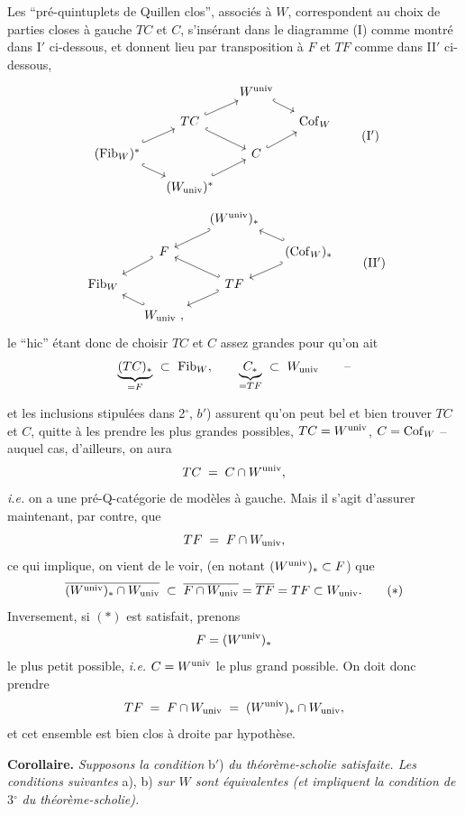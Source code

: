 Les “pré-quintuplets de Quillen clos”, associés à $W$, correspondent au choix de parties closes à gauche $TC$ et $C$, s'insérant dans le diagramme (I) comme montré dans I$'$ ci-dessous, et donnent lieu par transposition à $F$ et $TF$ comme dans II$'$ ci-dessous,
\[
\begin{tikzcd}[column sep=small, row sep=small]
 & & W^{\univ} \arrow[dr, hook] & \\
 & TC \arrow[ur, hook] \arrow[dr, hook] & & \Cof_W \\
(\Fib_W)^* \arrow[ur, hook] \arrow[dr, hook] & & C \arrow[ur, hook] & \\
 & (W_{\univ})^* \arrow[ur, hook] & &
\end{tikzcd}
\tag*{(I$'$)}
\]
\[
\begin{tikzcd}[column sep=small, row sep=small]
 & & (W^{\univ})_* \arrow[dl, hook'] & \\
 & F \arrow[dl, hook'] & & (\Cof_W)_* \arrow[ul, hook'] \arrow[dl, hook'] \\
\Fib_W & & TF \arrow[ul, hook'] \arrow[dl, hook'] & \\
 & W_{\univ}\ , \arrow[ul, hook'] & &
\end{tikzcd}
\tag*{(II$'$)}
\]
le “hic” étant donc de choisir $TC$ et $C$ assez grandes pour qu'on ait
\[ \underbrace{(TC)_*}_{= F} \ \subset\ \mathrm{Fib}_W, \qquad \underbrace{C_*}_{= TF} \ \subset\ W_{\mathrm{univ}} \qquad \text{--} \]


\noindent et les inclusions stipulées dans 2$^\circ$, $b'$) assurent qu'on peut bel et bien trouver $TC$ et $C$, quitte à les prendre les plus grandes possibles, $TC = W^{\mathrm{univ}}$, $C = \mathrm{Cof}_W$ -- auquel cas, d'ailleurs, on aura
\[
TC \;=\; C \cap W^{\mathrm{univ}},
\]
\textit{i.e.} on a une pré-Q-catégorie de modèles à gauche. Mais il s'agit d'assurer maintenant, par contre, que
\[
TF \;=\; F \cap W_{\mathrm{univ}},
\]
ce qui implique, on vient de le voir, (en notant $(W^{\mathrm{univ}})_* \subset F$) que
\[
\overline{(W^{\mathrm{univ}})_* \cap W_{\mathrm{univ}}} \;\subset\; \overline{F \cap W_{\mathrm{univ}}} = \overline{TF} = TF \subset W_{\mathrm{univ}}. \tag*{$(*)$}
\]
Inversement, si $(*)$ est satisfait, prenons
\[
F = (W^{\mathrm{univ}})_*
\]
le plus petit possible, \textit{i.e.} $C = W^{\mathrm{univ}}$ le plus grand possible. On doit donc prendre
\[
TF \;=\; F \cap W_{\mathrm{univ}} \;=\; (W^{\mathrm{univ}})_* \cap W_{\mathrm{univ}},
\]
et cet ensemble est bien clos à droite par hypothèse.

\textbf{Corollaire.} \textit{Supposons la condition} b$'$) \textit{du théorème-scholie satisfaite. Les conditions suivantes} a), b) \textit{sur $W$ sont équivalentes (et impliquent la condition de} 3$^\circ$ \textit{du théorème-scholie).}

